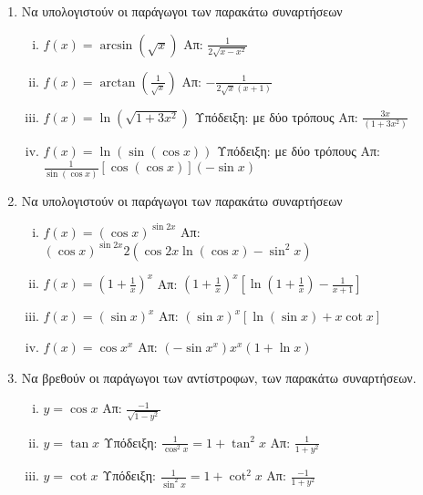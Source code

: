 \documentclass[a4paper,table]{report}
\begin{document}
\begin{center}
  \minibox{\large \bfseries \textcolor{Col1}{Ασκήσεις στις Παραγώγους}}
\end{center}

\vspace{\baselineskip}

\begin{enumerate}

  \item Να υπολογιστούν οι παράγωγοι των παρακάτω συναρτήσεων
    \begin{enumerate}[(i)]
      \item $ f(x)= \arcsin(\sqrt{x}) $ \hfill Απ: $ \frac{1}{2 \sqrt{x-x^{2}}} $ 
      \item $ f(x)= \arctan(\frac{1}{\sqrt{x}}) $ \hfill Απ: $ - \frac{1}{2 \sqrt{x}
        (x+1)} $  
      \item $ f(x) = \ln{(\sqrt{1+3x^{2}})} $ \quad
        \textcolor{Col1}{Υπόδειξη:} με δύο τρόπους
        \hfill Απ: $ \frac{3x}{(1+3x^{2})} $
      \item $ f(x) = \ln({\sin({\cos{x}})}) $ \quad 
        \textcolor{Col1}{Υπόδειξη:} με δύο τρόπους \hfill Απ: $
        \frac{1}{\sin{(\cos{x})}} [\cos{(\cos{x})}] (- \sin{x}) $ 
    \end{enumerate}

  \item  Να υπολογιστούν οι παράγωγοι των παρακάτω συναρτήσεων

    \begin{enumerate}[(i)]
      \item $ f(x) = (\cos{x})^{\sin{2x}} $ \hfill Απ: $
        (\cos{x})^{\sin{2x}} 2(\cos{2x} \ln{(\cos{x})} - \sin^{2}{x}) $
      \item $ f(x) = \left(1 + \frac{1}{x} \right)^{x} $ \hfill Απ: $
        \left(1 + \frac{1}{x}\right)^{x}\left[\ln{(1 + \frac{1}{x})} -
        \frac{1}{x+1}\right] $
      \item $ f(x)=(\sin{x})^{x} $ \hfill Απ: $ (\sin{x})^{x}[\ln{(\sin{x}
        )} + x \cot{x}] $ 
      \item $ f(x)=\cos{x}^{x} $ \hfill Απ: $ (- \sin{x^{x}})x^{x} (1 +
        \ln{x}) $
    \end{enumerate}

  \item Να βρεθούν οι παράγωγοι των αντίστροφων, των παρακάτω συναρτήσεων.
    \begin{enumerate}[(i)]
      \item $ y = \cos{x} $ \hfill Απ: $ \frac{-1}{\sqrt{1 - y^{2}}} $
      \item $ y = \tan{x} $ \quad \textcolor{Col1}{Υπόδειξη:} 
        $ \frac{1}{\cos^{2}{x}} = 1+ \tan^{2}{x} $ 
        \hfill Απ: $ \frac{1}{1 + y^{2}} $
      \item $ y = \cot{x} $ \quad \textcolor{Col1}{Υπόδειξη:} 
        $ \frac{1}{\sin^{2}{x}} = 1 + \cot^{2}{x} $
        \hfill Απ: $ \frac{-1}{1 + y^{2}} $
    \end{enumerate}


\end{enumerate}
\end{document}
